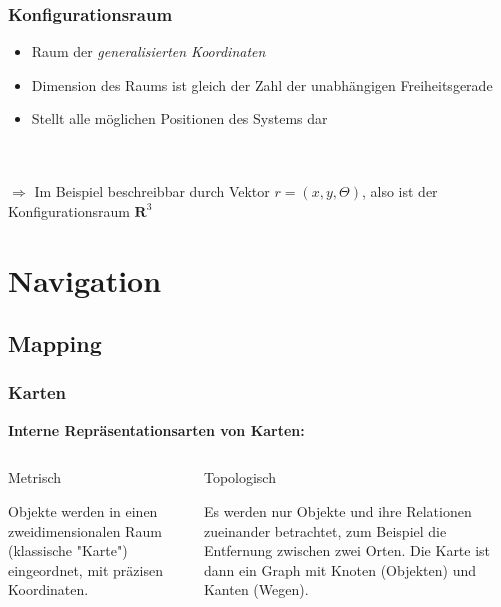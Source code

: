 \documentclass{beamer}
\begin{document}
\begin{frame}
\frametitle{Konfigurationsraum}
\begin{itemize}

\item Raum der \textit{generalisierten Koordinaten} 
\item Dimension des Raums ist gleich der Zahl der unabhängigen Freiheitsgerade 
\item Stellt alle möglichen Positionen des Systems dar \\ %
\end{itemize}
\quad \\
\quad \\
\centering
\pause
$\Rightarrow$  Im Beispiel beschreibbar durch Vektor $r = ( x,y,\Theta)$, also ist der Konfigurationsraum $\textbf{R}^3$

\end{frame}



\section{Navigation}



\subsection{Mapping}
\begin{frame}
\frametitle{Karten}
\begin{center}
\textbf{Interne Repräsentationsarten von Karten:}
\end{center}
\begin{columns}[T]
\begin{column}[T]{5cm}
\begin{center}
Metrisch
\end{center}
Objekte werden in einen zweidimensionalen Raum (klassische "Karte") eingeordnet, mit präzisen Koordinaten.
\end{column}

\begin{column}[T]{5cm}
\begin{center}
Topologisch
\end{center}
Es werden nur Objekte und ihre Relationen zueinander betrachtet, zum Beispiel die Entfernung zwischen zwei Orten. Die Karte ist dann ein Graph mit Knoten (Objekten) und Kanten (Wegen).
\end{column}
\end{columns}
\end{frame}
\end{document}
